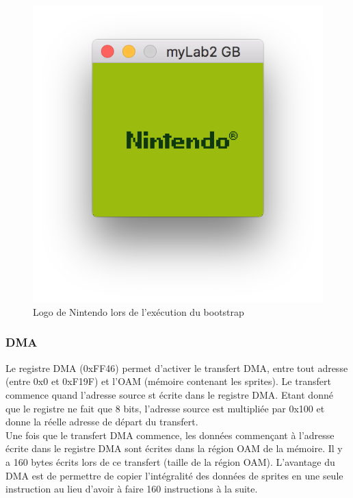 \documentclass[a4paper]{article}
\begin{document}
\begin{figure}[!h]
  \centering
  \includegraphics[scale=0.6]{images/bootstrap.png}
  \caption{Logo de Nintendo lors de l'exécution du bootstrap}
\end{figure}

\subsubsection{DMA}
Le registre DMA (0xFF46) permet d'activer le transfert DMA, entre tout adresse
(entre 0x0 et 0xF19F) et l'OAM (mémoire contenant les sprites). Le transfert commence
quand l'adresse source st écrite dans le registre DMA. Etant donné que le registre
ne fait que 8 bits, l'adresse source est multipliée par 0x100 et donne la réelle
adresse de départ du transfert. \\

Une fois que le transfert DMA commence, les données commençant à l'adresse
écrite dans le registre DMA sont écrites dans la région OAM de la mémoire.
Il y a 160 bytes écrits lors de ce transfert (taille de la région OAM).  L'avantage 
du DMA est de permettre de copier l'intégralité des données de sprites en une seule 
instruction au lieu d'avoir à faire 160 instructions à la suite.

\end{document}
